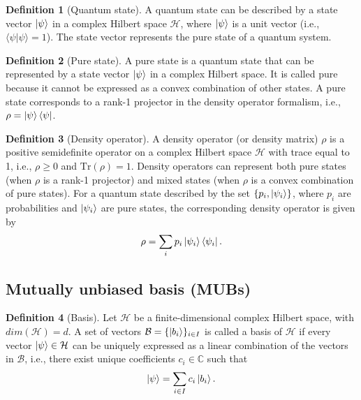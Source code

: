 \documentclass[oneside, a4paper, onecolumn, 11pt]{article}
\theoremstyle{definition}
\newtheorem{definition}{Definition}[section]
\theoremstyle{plain}
\theoremstyle{remark}
\begin{document}
\begin{definition}[Quantum state]
A quantum state can be described by a state vector $\ket{\psi}$ in a complex Hilbert space $\mathcal{H}$, where $\ket{\psi}$ is a unit vector (i.e., $\langle \psi | \psi \rangle = 1$). The state vector represents the pure state of a quantum system.  
\end{definition}

\begin{definition}[Pure state]
  A pure state is a quantum state that can be represented by a state vector $\ket{\psi}$ in a complex Hilbert space. It is called pure because it cannot be expressed as a convex combination of other states. A pure state corresponds to a rank-1 projector in the density operator formalism, i.e., $\rho = \ket{\psi}\bra{\psi}$.
\end{definition}

\begin{definition}[Density operator]
  A density operator (or density matrix) $\rho$ is a positive semidefinite operator on a complex Hilbert space $\mathcal{H}$ with trace equal to 1, i.e., $\rho \geq 0$ and $\text{Tr}(\rho) = 1$. Density operators can represent both pure states (when $\rho$ is a rank-1 projector) and mixed states (when $\rho$ is a convex combination of pure states).
  For a quantum state described by the set $\{p_i, \ket{\psi_i}\}$, where $p_i$ are probabilities and $\ket{\psi_i}$ are pure states, the corresponding density operator is given by
  \begin{equation}
    \rho = \sum_i p_i \ket{\psi_i}\bra{\psi_i}.
  \end{equation} 
\end{definition}

\subsection{Mutually unbiased basis (MUBs)}

\begin{definition}[Basis]
  Let $\mathcal{H}$ be a finite-dimensional complex Hilbert space, with $dim(\mathcal{H}) = d$. A set of vectors $\mathcal{B} = \{\ket{b_i}\}_{i \in I}$ is called a basis of $\mathcal{H}$ if every vector $\ket{\psi} \in \mathcal{H}$ can be uniquely expressed as a linear combination of the vectors in $\mathcal{B}$, i.e., there exist unique coefficients $c_i \in \mathbb{C}$ such that
  \begin{equation}
    \ket{\psi} = \sum_{i \in I} c_i \ket{b_i}.
  \end{equation}
\end{definition}
\end{document}
